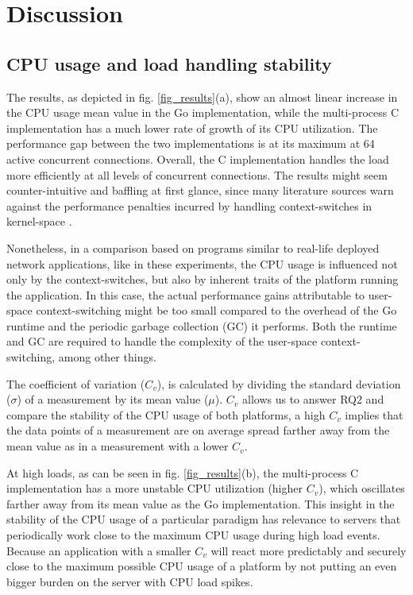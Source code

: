 \section{Discussion}
\subsection{CPU usage and load handling stability}
The results, as depicted in fig. \ref{fig_results}(a), show an almost linear increase in the CPU usage mean value in the Go implementation, while the multi-process C implementation has a much lower rate of growth of its CPU utilization. The performance gap between the two implementations is at its maximum at 64 active concurrent connections. Overall, the C implementation handles the load more efficiently at all levels of concurrent connections. The results might seem counter-intuitive and baffling at first glance, since many literature sources warn against the performance penalties incurred by handling context-switches in kernel-space \cite{Cox-Buday2017}\cite{Kerrisk2010}. 

Nonetheless, in a comparison based on programs similar to real-life deployed network applications, like in these experiments, the CPU usage is influenced not only by the context-switches, but also by inherent traits of the platform running the application. In this case, the actual performance gains attributable to user-space context-switching might be too small compared to the overhead of the Go runtime and the periodic garbage collection (GC) it performs. Both the runtime and GC are required to handle the complexity of the user-space context-switching, among other things.

The coefficient of variation ($C_v$), is calculated by dividing the standard deviation ($\sigma$) of a measurement by its mean value ($\mu$). $C_v$ allows us to answer RQ2 and compare the stability of the CPU usage of both platforms, a high $C_v$ implies that the data points of a measurement are on average spread farther away from the mean value as in a measurement with a lower $C_v$. 

At high loads, as can be seen in fig. \ref{fig_results}(b), the multi-process C implementation has a more unstable CPU utilization (higher $C_v$), which oscillates farther away from its mean value as the Go implementation. This insight in the stability of the CPU usage of a particular paradigm has relevance to servers that periodically work close to the maximum CPU usage during high load events. Because an application with a smaller $C_v$ will react more predictably and securely close to the maximum possible CPU usage of a platform by not putting an even bigger burden on the server with CPU load spikes.

